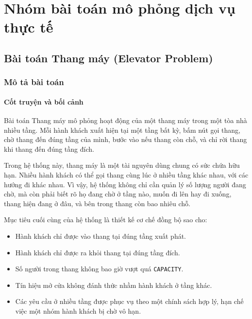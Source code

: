 \chapter{Nhóm bài toán mô phỏng dịch vụ thực tế}

\section{Bài toán Thang máy (Elevator Problem)}

\subsection{Mô tả bài toán}

\subsubsection*{Cốt truyện và bối cảnh}

Bài toán Thang máy mô phỏng hoạt động của một thang máy trong một tòa nhà
nhiều tầng. Mỗi hành khách xuất hiện tại một tầng bất kỳ, bấm nút gọi
thang, chờ thang đến đúng tầng của mình, bước vào nếu thang còn chỗ, và
chỉ rời thang khi thang đến đúng tầng đích.

Trong hệ thống này, thang máy là một tài nguyên dùng chung có sức chứa
hữu hạn. Nhiều hành khách có thể gọi thang cùng lúc ở nhiều tầng khác
nhau, với các hướng đi khác nhau. Vì vậy, hệ thống không chỉ cần quản lý
số lượng người đang chờ, mà còn phải biết rõ họ đang chờ ở tầng nào,
muốn đi lên hay đi xuống, thang hiện đang ở đâu, và bên trong thang còn
bao nhiêu chỗ.

Mục tiêu cuối cùng của hệ thống là thiết kế cơ chế đồng bộ sao cho:

\begin{itemize}
    \item Hành khách chỉ được vào thang tại đúng tầng xuất phát.
    \item Hành khách chỉ được ra khỏi thang tại đúng tầng đích.
    \item Số người trong thang không bao giờ vượt quá \texttt{CAPACITY}.
    \item Tín hiệu mở cửa không đánh thức nhầm hành khách ở tầng khác.
    \item Các yêu cầu ở nhiều tầng được phục vụ theo một chính sách hợp lý,
    hạn chế việc một nhóm hành khách bị chờ vô hạn.
\end{itemize}

